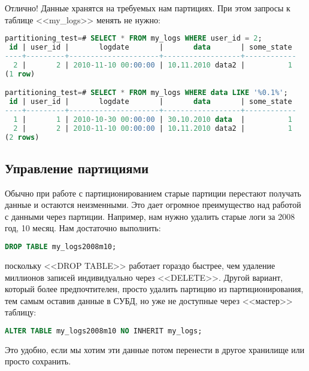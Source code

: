 Отлично! Данные хранятся на требуемых нам партициях. При этом запросы к таблице <<my\_logs>> менять не нужно:
\begin{lstlisting}[language=SQL,label=lst:partitioning11,caption=Проверка запросов]
partitioning_test=# SELECT * FROM my_logs WHERE user_id = 2;
 id | user_id |       logdate       |       data       | some_state 
----+---------+---------------------+------------------+------------
  2 |       2 | 2010-11-10 00:00:00 | 10.11.2010 data2 |          1
(1 row)

partitioning_test=# SELECT * FROM my_logs WHERE data LIKE '%0.1%';
 id | user_id |       logdate       |       data       | some_state 
----+---------+---------------------+------------------+------------
  1 |       1 | 2010-10-30 00:00:00 | 30.10.2010 data  |          1
  2 |       2 | 2010-11-10 00:00:00 | 10.11.2010 data2 |          1
(2 rows)
\end{lstlisting}

\subsection{Управление партициями}
Обычно при работе с партиционированием старые партиции перестают получать данные и остаются неизменными. 
Это дает огромное преимущество над работой с данными через партиции. Например, нам нужно удалить старые логи за 2008 год, 10 месяц. Нам достаточно выполнить:
\begin{lstlisting}[language=SQL,label=lst:partitioning12,caption=Чистка логов]
DROP TABLE my_logs2008m10;
\end{lstlisting}
поскольку <<DROP TABLE>> работает гораздо быстрее, чем удаление миллионов записей индивидуально через <<DELETE>>.
Другой вариант, который более предпочтителен, просто удалить партицию из партиционирования, 
тем самым оставив данные в СУБД, но уже не доступные через <<мастер>> таблицу: 
\begin{lstlisting}[language=SQL,label=lst:partitioning13,caption=Удаляем партицию из партиционирования]
ALTER TABLE my_logs2008m10 NO INHERIT my_logs; 
\end{lstlisting}
Это удобно, если мы хотим эти данные потом перенести в другое хранилище или просто сохранить.


